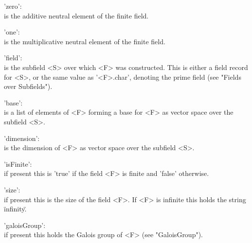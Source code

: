 'zero': \\
        is the additive neutral element of the finite field.

'one': \\
        is the multiplicative neutral element of the finite field.

'field': \\
        is  the subfield  <S> over which   <F> was constructed.  This  is
        either a field  record for <S>, or the  same value as '<F>.char',
        denoting the prime field (see "Fields over Subfields").

'base': \\
        is a list of elements  of <F> forming a  base  for <F> as  vector
        space over the subfield <S>.

'dimension': \\
        is the dimension of <F> as vector space over the subfield <S>.

'isFinite': \\
        if present this is 'true' if the field  <F> is finite and 'false'
        otherwise.

'size': \\
        if present this is the size of the field <F>.  If <F> is infinite
        this holds the string \"infinity\".

'galoisGroup': \\
        if    present   this holds  the     Galois    group of  <F>  (see
        "GaloisGroup").




